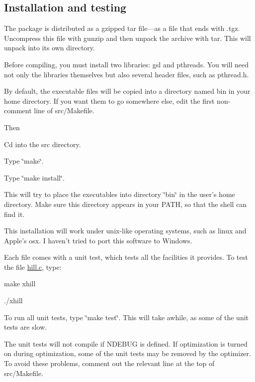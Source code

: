 \subsection*{Installation and testing}

The package is distributed as a gzipped tar file---as a file that ends with .tgz. Uncompress this file with {\ttfamily gunzip} and then unpack the archive with {\ttfamily tar}. This will unpack into its own directory.

Before compiling, you must install two libraries\-: {\ttfamily gsl} and {\ttfamily pthreads}. You will need not only the libraries themselves but also several header files, such as {\ttfamily pthread.\-h}.

By default, the executable files will be copied into a directory named {\ttfamily bin} in your home directory. If you want them to go somewhere else, edit the first non-\/comment line of src/\-Makefile.

Then


\begin{DoxyEnumerate}
\item Cd into the src directory.
\item Type \char`\"{}make\char`\"{}.
\item Type \char`\"{}make install\char`\"{}.
\end{DoxyEnumerate}

This will try to place the executables into directory \char`\"{}bin\char`\"{} in the user's home directory. Make sure this directory appears in your P\-A\-T\-H, so that the shell can find it.

This installation will work under unix-\/like operating systems, such as linux and Apple's osx. I haven't tried to port this software to Windows.

Each file comes with a unit test, which tests all the facilities it provides. To test the file {\ttfamily \hyperlink{hill_8c}{hill.\-c}}, type\-:


\begin{DoxyEnumerate}
\item make xhill
\item ./xhill
\end{DoxyEnumerate}

To run all unit tests, type \char`\"{}make test\char`\"{}. This will take awhile, as some of the unit tests are slow.

The unit tests will not compile if {\ttfamily N\-D\-E\-B\-U\-G} is defined. If optimization is turned on during optimization, some of the unit tests may be removed by the optimizer. To avoid these problems, comment out the relevant line at the top of src/\-Makefile.

